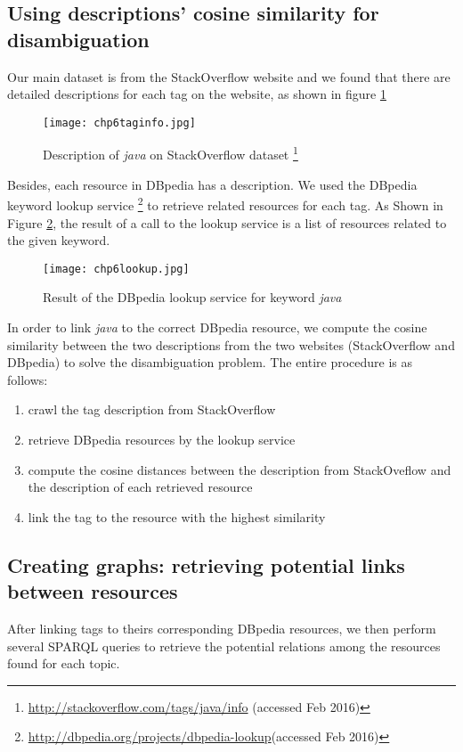 \subsection{Using descriptions' cosine similarity for disambiguation}
Our main dataset is from the StackOverflow website and we found that there are detailed descriptions for each tag on the website, as shown in figure \ref{fig:chp6taginfo}
\begin{figure}[htp]
\centering
\texttt{[image: chp6taginfo.jpg]}  
\caption{Description of \textit{java} on StackOverflow dataset \footnote{\url{http://stackoverflow.com/tags/java/info} (accessed Feb 2016)}}
\label{fig:chp6taginfo} 
\end{figure}

Besides, each resource in DBpedia has a description.  We used the DBpedia keyword lookup service \footnote{\url{http://dbpedia.org/projects/dbpedia-lookup}(accessed Feb 2016)} to retrieve related resources for each tag. As Shown in Figure \ref{fig:chp6lookup}, the result of a call to the lookup service is a list of resources related to the given keyword.

\begin{figure}[htp]
\centering
\texttt{[image: chp6lookup.jpg]}  
\caption{Result of the DBpedia lookup service for keyword \textit{java}}
\label{fig:chp6lookup} 
\end{figure}

In order to link \textit{java} to the correct DBpedia resource, we compute the cosine similarity between the two descriptions from the two websites (StackOverflow and DBpedia) to solve the disambiguation problem. The  entire procedure is as follows:


\begin{enumerate}
    \item{crawl the tag description from StackOverflow}
    \item{retrieve DBpedia resources by the lookup service}
    \item{compute the cosine distances between the description from StackOveflow and the description of each retrieved resource}
    \item{link the tag to the resource with the highest similarity}
\end{enumerate}


\subsection{Creating graphs: retrieving potential links between resources}
After linking tags to theirs corresponding DBpedia resources, we then perform several SPARQL queries to retrieve the potential relations among the resources found for each topic. 



